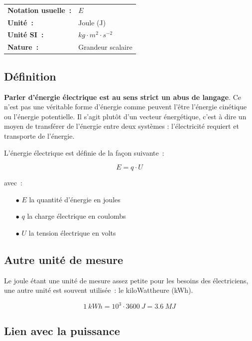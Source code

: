 \begin{tabular}{ll}
\textbf{Notation usuelle~:} & $E$ \\
\textbf{Unité~:} & Joule (J) \\
	\textbf{Unité SI~:} & $kg \cdot m^2 \cdot s^{-2}$ \\
\textbf{Nature~:} & Grandeur scalaire \\
\end{tabular} 

\subsection*{Définition}

\textbf{Parler d'énergie électrique est au sens strict un abus de langage}. Ce n'est pas une véritable forme d'énergie comme peuvent l'être l'énergie cinétique ou l'énergie potentielle. Il s'agit plutôt d'un vecteur énergétique, c'est à dire un moyen de transférer de l'énergie entre deux systèmes : l'électricité requiert et transporte de l'énergie.\\

L'énergie électrique est définie de la façon suivante~:

\begin{equation}
	E = q \cdot U
\end{equation}

avec~:\\
\begin{itemize}
	\item[$\bullet$] $E$ la quantité d'énergie en joules
	\item[$\bullet$] $q$ la charge électrique en coulombs
	\item[$\bullet$] $U$ la tension électrique en volts
\end{itemize}

\subsection*{Autre unité de mesure}

Le joule étant une unité de mesure assez petite pour les besoins des électriciens, une autre unité est souvent utilisée~: le kiloWattheure (kWh). 

$$ 1\:kWh = 10^3 \cdot 3600\:J = 3.6\:MJ $$


\subsection*{Lien avec la puissance}


